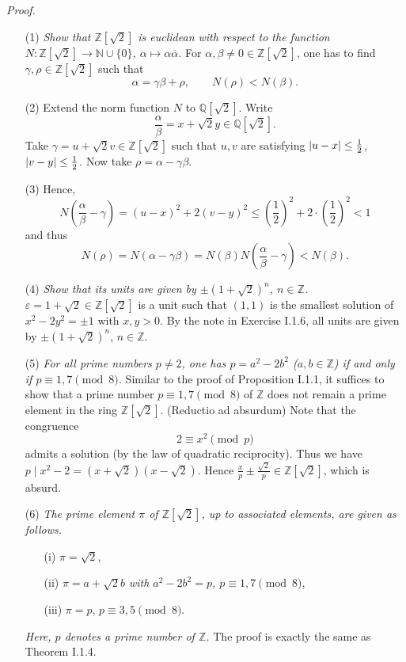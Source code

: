\documentclass{article}
\begin{document}
\emph{Proof.}
\begin{enumerate}
\item[(1)]
  \emph{Show that $\mathbb{Z}[\sqrt{2}]$ is euclidean with respect to the function
  $N: \mathbb{Z}[\sqrt{2}] \to \mathbb{N} \cup \{0\}$, $\alpha \mapsto \alpha \overline{\alpha}$.}
  For $\alpha, \beta \neq 0 \in \mathbb{Z}[\sqrt{2}]$,
  one has to find $\gamma, \rho \in \mathbb{Z}[\sqrt{2}]$
  such that
  \[
    \alpha = \gamma\beta + \rho,
    \qquad
    N(\rho) < N(\beta).
  \]

\item[(2)]
  Extend the norm function $N$ to $\mathbb{Q}[\sqrt{2}]$.
  Write
  \[
    \frac{\alpha}{\beta} = x + \sqrt{2}y \in \mathbb{Q}[\sqrt{2}].
  \]
  Take $\gamma = u + \sqrt{2}v \in \mathbb{Z}[\sqrt{2}]$
  such that $u, v$ are satisfying $\abs{u - x} \leq \frac{1}{2}$, $\abs{v - y} \leq \frac{1}{2}$.
  Now take $\rho = \alpha - \gamma\beta$.

\item[(3)]
  Hence,
  \[
    N\left(\frac{\alpha}{\beta} - \gamma\right)
    = (u-x)^2 + 2 (v-y)^2
    \leq \left(\frac{1}{2}\right)^{2} + 2 \cdot \left(\frac{1}{2}\right)^{2}
    < 1
  \]
  and thus
  \[
    N(\rho)
    = N(\alpha - \gamma\beta)
    = N(\beta) N\left(\frac{\alpha}{\beta} - \gamma\right)
    < N(\beta).
  \]

\item[(4)]
  \emph{Show that its units are given by $\pm(1+\sqrt{2})^n$, $n \in \mathbb{Z}$.}
  $\varepsilon = 1 + \sqrt{2} \in \mathbb{Z}[\sqrt{2}]$ is a unit such that
  $(1,1)$ is the smallest solution of $x^2 - 2y^2 = \pm 1$ with $x, y > 0$.
  By the note in Exercise I.1.6,
  all units are given by $\pm(1+\sqrt{2})^n$, $n \in \mathbb{Z}$.

\item[(5)]
  \emph{For all prime numbers $p \neq 2$, one has
  $p = a^2 - 2b^2$ ($a, b \in \mathbb{Z}$) if and only if $p \equiv 1, 7 \pmod 8$.}
  Similar to the proof of Proposition I.1.1,
  it suffices to show that a prime number $p \equiv 1, 7 \pmod 8$ of $\mathbb{Z}$
  does not remain a prime element in the ring $\mathbb{Z}[\sqrt{2}]$.
  (Reductio ad absurdum)
  Note that the congruence
  \[
    2 \equiv x^2 \pmod p
  \]
  admits a solution (by the law of quadratic reciprocity).
  Thus we have $p \mid x^2 - 2 = (x + \sqrt{2})(x - \sqrt{2})$.
  Hence $\frac{x}{p} \pm \frac{\sqrt{2}}{p} \in \mathbb{Z}[\sqrt{2}]$, which is absurd.

\item[(6)]
  \emph{The prime element $\pi$ of $\mathbb{Z}[\sqrt{2}]$, up to associated elements,
  are given as follows.}
  \begin{enumerate}
  \item[(i)]
    $\pi = \sqrt{2}$,

  \item[(ii)]
    \emph{$\pi = a + \sqrt{2}b$ with $a^2 - 2b^2 = p$, $p \equiv 1, 7 \pmod 8$},

  \item[(iii)]
    $\pi = p$, $p \equiv 3, 5 \pmod 8$.
  \end{enumerate}
  \emph{Here, $p$ denotes a prime number of $\mathbb{Z}$.}
  The proof is exactly the same as Theorem I.1.4.
\end{enumerate}
\end{document}
